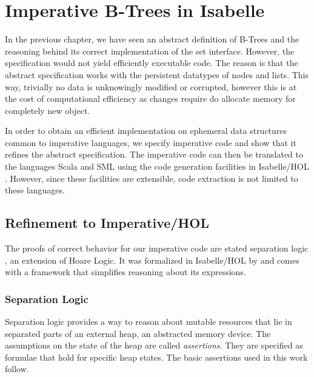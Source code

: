
\chapter{Imperative B-Trees in Isabelle}\label{chapter:imp-set}

In the previous chapter, we have seen
an abstract definition of B-Trees and the reasoning
behind its correct implementation of the set interface.
However, the specification would not yield 
efficiently executable code.
The reason is that the abstract specification works with
the persistent datatypes of nodes and lists.
This way, trivially no data is unknowingly
modified or corrupted,
however this is at the cost of computational efficiency
as changes require do allocate memory for completely new object.

In order to obtain an efficient implementation
on ephemeral data structures common to imperative languages,
we specify imperative code and show that
it refines the abstract specification.
The imperative code can then be translated to
the languages Scala \parencite{OderskyScala} and SML \parencite{DBLP:books/daglib/0069232}
using the code generation
facilities in Isabelle/HOL \parencite{Haftmann20codegeneration}.
However, since these facilities are extensible,
code extraction is not limited
to these languages.

\section{Refinement to Imperative/HOL}

The proofs of correct behavior for our imperative
code are stated separation logic \parencite{DBLP:conf/lics/Reynolds02},
an extension of Hoare Logic.
It was formalized in Isabelle/HOL by \parencite{DBLP:journals/jar/Lammich19}
and comes with a framework that simplifies reasoning about
its expressions.

\subsection{Separation Logic}

Separation logic provides a way to reason about mutable resources
that lie in separated parts of an external heap,
an abstracted memory device.
The assumptions on the state of the heap are called \textit{assertions}.
They are specified as formulae that hold for specific heap states.
The basic assertions used in this work follow.

